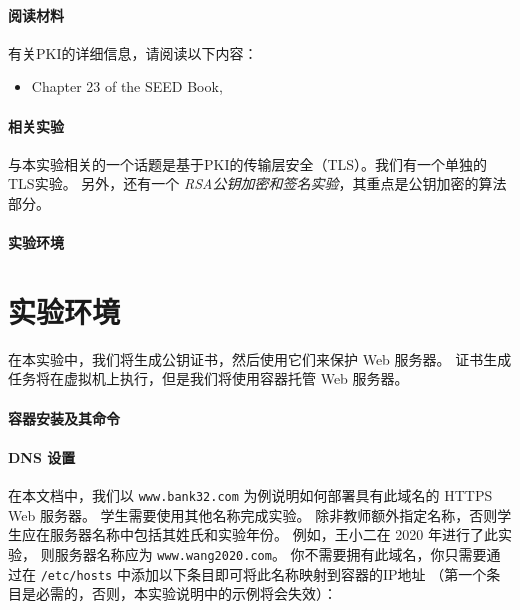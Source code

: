 \paragraph{阅读材料}
有关PKI的详细信息，请阅读以下内容：

\begin{itemize}
\item Chapter 23 of the SEED Book, \seedbook
\end{itemize}


\paragraph{相关实验}

与本实验相关的一个话题是基于PKI的传输层安全（TLS）。我们有一个单独的TLS实验。
另外，还有一个 \textit{RSA公钥加密和签名实验}，其重点是公钥加密的算法部分。


\paragraph{实验环境} \seedenvironmentB


\section{实验环境}

在本实验中，我们将生成公钥证书，然后使用它们来保护 Web 服务器。
证书生成任务将在虚拟机上执行，但是我们将使用容器托管 Web 服务器。

\paragraph{容器安装及其命令}




\paragraph{DNS 设置}

在本文档中，我们以 \texttt{www.bank32.com} 为例说明如何部署具有此域名的 HTTPS Web 服务器。
学生需要使用其他名称完成实验。
除非教师额外指定名称，否则学生应在服务器名称中包括其姓氏和实验年份。
例如，王小二在 2020 年进行了此实验，
则服务器名称应为 \texttt{www.wang2020.com}。
你不需要拥有此域名，你只需要通过在 \texttt{/etc/hosts}
中添加以下条目即可将此名称映射到容器的IP地址
（第一个条目是必需的，否则，本实验说明中的示例将会失效）：


